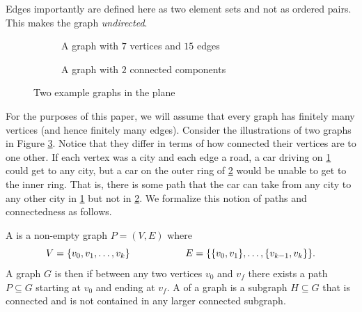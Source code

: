 \documentclass[11pt]{article}
\begin{document}
\begin{remark}
    Edges importantly are defined here as two element sets and not as ordered pairs. This makes the graph \textit{undirected}.
\end{remark}

\begin{figure}
    \centering
    \begin{subfigure}[t]{0.45\textwidth}
        \centering
        \caption{A graph with $7$ vertices and $15$ edges}
        \label{fig:basic_graph}
    \end{subfigure}\hfill
    \begin{subfigure}[t]{0.45\textwidth}
        \centering
        \caption{A graph with $2$ connected components}
        \label{fig:connected_components}
    \end{subfigure}
    \caption{Two example graphs in the plane}
    \label{fig:graph_visual}
\end{figure}

For the purposes of this paper, we will assume that every graph has finitely many vertices (and hence finitely many edges). Consider the illustrations of two graphs in Figure \ref{fig:graph_visual}. Notice that they differ in terms of how connected their vertices are to one other. If each vertex was a city and each edge a road, a car driving on \ref{fig:basic_graph} could get to any city, but a car on the outer ring of \ref{fig:connected_components} would be unable to get to the inner ring. That is, there is some path that the car can take from any city to any other city in \ref{fig:basic_graph} but not in \ref{fig:connected_components}. We formalize this notion of paths and connectedness as follows.

\begin{definition}[Connectedness]
    A  is a non-empty graph $P = (V,E)$ where
    \[
        V = \qty{v_0, v_1, \ldots, v_k} \hspace{2cm} E = \qty{\qty{v_0,v_1}, \ldots, \qty{v_{k-1}, v_k}}
    .\]
    A graph $G$ is then  if between any two vertices $v_0$ and $v_f$ there exists a path $P \subseteq G$ starting at $v_0$ and ending at $v_f$. A  of a graph is a subgraph $H \subseteq G$ that is connected and is not contained in any larger connected subgraph.
\end{definition}
\end{document}
